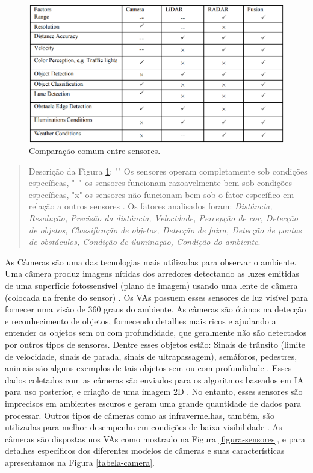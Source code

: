 \begin{figure}[H]
\centering
\includegraphics[width=12cm]{Figures/juncao-table.png}
\caption{Comparação comum entre sensores.}
\label{tabela-juncao}
\end{figure}
\begin{quote}
Descrição da Figura \ref{tabela-juncao}: "\checkmark" Os sensores operam completamente sob condições específicas,
"--" os sensores funcionam razoavelmente bem sob condições específicas, "x" os sensores não funcionam bem sob o fator específico em relação a outros sensores \cite{sensors}.
Os fatores analisados foram: \textit{Distância, Resolução, Precisão da distância, Velocidade, Percepção de cor, Detecção de objetos, Classificação de objetos, Detecção de faixa, Detecção de pontas de obstáculos, Condição de iluminação, Condição do ambiente}. 
\end{quote}

 \label{camera}

As Câmeras são uma das tecnologias mais utilizadas para observar o ambiente. Uma câmera produz imagens nítidas dos arredores detectando as luzes emitidas de uma superfície fotossensível (plano de imagem) usando uma lente de câmera (colocada na frente do sensor) \cite{sensors}. Os VAs possuem esses sensores de luz visível para fornecer uma visão de 360 graus do ambiente. As câmeras são ótimos na detecção e reconhecimento de objetos, fornecendo detalhes mais ricos e ajudando a entender os objetos sem ou com profundidade, que geralmente não são detectados por outros tipos de sensores. Dentre esses objetos estão: Sinais de trânsito (limite de velocidade, sinais de parada, sinais de ultrapassagem), semáforos, pedestres, animais são alguns exemplos de tais objetos sem ou com profundidade \cite{sensors-yet}. Esses dados coletados com as câmeras são enviados para os algoritmos baseados em IA para uso posterior, e criação de uma imagem 2D \cite{aplicacao2}. 
No entanto, esses sensores são imprecisos em ambientes escuros e geram uma grande quantidade de dados para processar. Outros tipos de câmeras como as infravermelhas, também, são utilizadas para melhor desempenho em condições de baixa visibilidade \cite{review-auto}. As câmeras são dispostas nos VAs como mostrado na Figura \ref{figura-sensores}, e para detalhes específicos dos diferentes modelos de câmeras e suas características apresentamos na Figura \ref{tabela-camera}.

